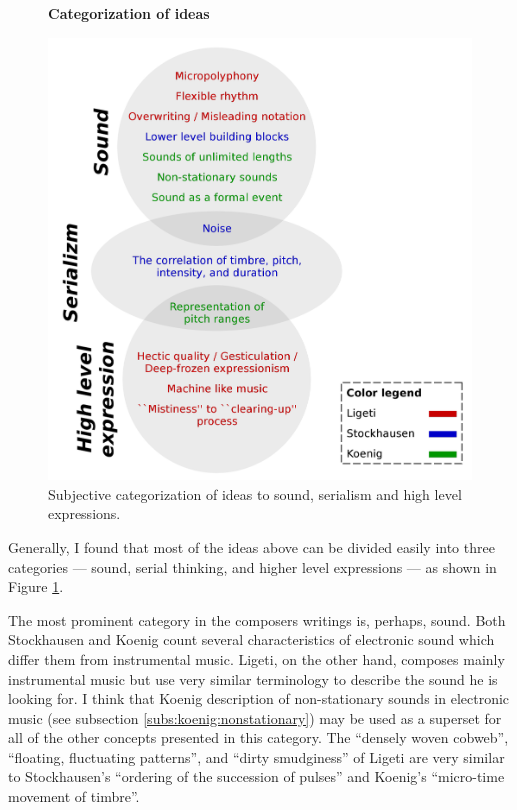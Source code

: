 \documentclass[a4paper,11pt]{article}
\begin{document}
\begin{figure}[!htb]
  \centering
  \textbf{Categorization of ideas}\par\medskip
  \includegraphics[width=\linewidth]{graphics/concepts_categorization.pdf}
  \caption{Subjective categorization of ideas to sound, serialism and high level expressions.}
  \label{fig:concepts_categorization}
\end{figure}

Generally, I found that most of the ideas above can be divided easily into three categories --- sound, serial thinking, and higher level expressions --- as shown in Figure \ref{fig:concepts_categorization}.

The most prominent category in the composers writings is, perhaps, sound.
Both Stockhausen and Koenig count several characteristics of electronic sound which differ them from instrumental music.
Ligeti, on the other hand, composes mainly instrumental music but use very similar terminology to describe the sound he is looking for.
I think that Koenig description of non-stationary sounds in electronic music (see subsection \ref{subs:koenig:nonstationary}) may be used as a superset for all of the other concepts presented in this category.
The ``densely woven cobweb'', ``floating, fluctuating patterns'', and ``dirty smudginess'' of Ligeti are very similar to Stockhausen's ``ordering of the succession of pulses'' and Koenig's ``micro-time movement of timbre''.
\end{document}
